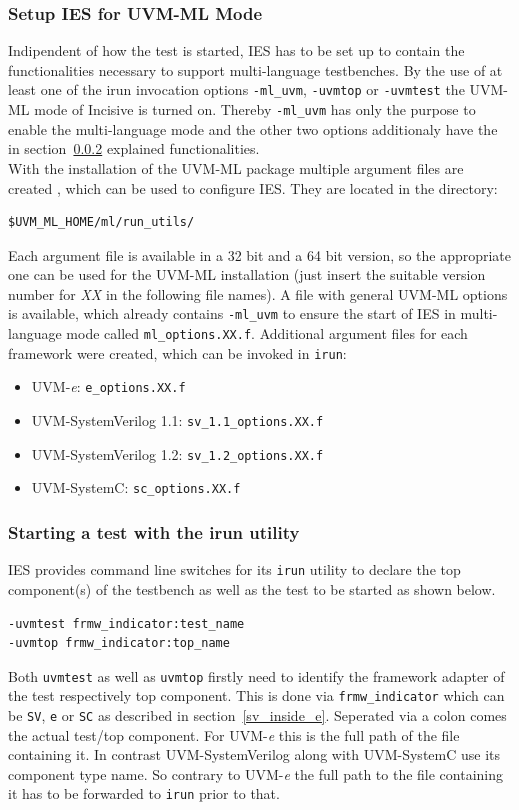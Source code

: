 \subsubsection{Setup IES for UVM-ML Mode}
Indipendent of how the test is started, IES has to be set up to contain the functionalities necessary to support multi-language testbenches. By the use of at least one of the irun invocation options \lstinline$-ml_uvm$, \lstinline$-uvmtop$ or \lstinline$-uvmtest$ the UVM-ML mode of Incisive is turned on. Thereby \lstinline$-ml_uvm$ has only the purpose to enable the multi-language mode and the other two options additionaly have the in section~\ref{uvm_top} explained functionalities.\\
With the installation of the UVM-ML package multiple argument files are created , which can be used to configure IES. They are located in the directory:
\begin{lstlisting}
$UVM_ML_HOME/ml/run_utils/
\end{lstlisting}
Each argument file is available in a 32 bit and a 64 bit version, so the appropriate one can be used for the UVM-ML installation (just insert the suitable version number for \emph{XX} in the following file names). A file with general UVM-ML options is available, which already contains \lstinline$-ml_uvm$ to ensure the start of IES in multi-language mode called \lstinline$ml_options.XX.f$. Additional argument files for each framework were created, which can be invoked in \lstinline$irun$:
\begin{itemize}
  \item UVM-\textit{e}: \lstinline$e_options.XX.f$
  \item UVM-SystemVerilog 1.1: \lstinline$sv_1.1_options.XX.f$
  \item UVM-SystemVerilog 1.2: \lstinline$sv_1.2_options.XX.f$
  \item UVM-SystemC: \lstinline$sc_options.XX.f$
\end{itemize}
\subsubsection{Starting a test with the irun utility} \label{uvm_top}
IES provides command line switches for its \lstinline$irun$ utility to declare the top component(s) of the testbench as
well as the test to be started as shown below.
\medskip
{}
\begin{lstlisting}
-uvmtest frmw_indicator:test_name
-uvmtop frmw_indicator:top_name
\end{lstlisting} 
\medskip
Both \lstinline$uvmtest$ as well as \lstinline$uvmtop$ firstly need to identify the framework adapter of the test
respectively top component. This is done via \lstinline$frmw_indicator$ which can be \lstinline$SV$, \lstinline$e$ or
\lstinline$SC$ as described in section~\ref{sv_inside_e}. Seperated via a colon comes the actual test/top component. For
UVM-\textit{e} this is the full path of the file containing it. In contrast UVM-SystemVerilog along with UVM-SystemC use
its component type name. So contrary to UVM-\textit{e} the full path to the file containing it has to be forwarded to
\lstinline$irun$ prior to that.

